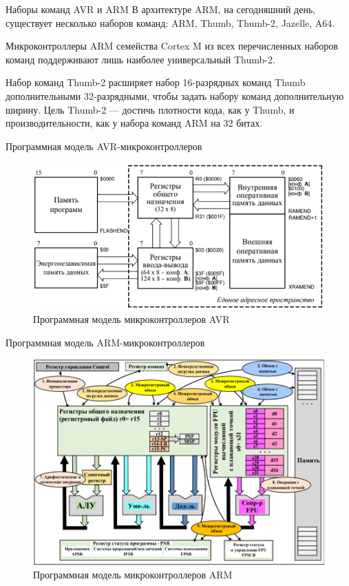 \documentclass[12pt,a4paper,mathserif]{beamer}
\begin{document}
\begin{frame}{Наборы команд AVR и ARM}
    \setlength{\parindent}{0.5cm}
    В архитектуре ARM, на сегодняшний день, существует несколько наборов команд: ARM, Thumb, Thumb-2, Jazelle, A64.
    
    Микроконтроллеры ARM семейства Cortex M из всех перечисленных наборов команд поддерживают лишь наиболее универсальный Thumb-2.
    
    Набор команд Thumb-2 расширяет набор 16-разрядных команд Thumb дополнительными 32-разрядными, чтобы задать набору команд дополнительную ширину. Цель Thumb-2 --- достичь плотности кода, как у Thumb, и производительности, как у набора команд ARM на 32 битах.
\end{frame}

\begin{frame}{Программная модель AVR-микроконтроллеров}
    \begin{figure}
        \centering
        \includegraphics[scale=0.8]{Program_model_AVR.png}
        \caption{Программная модель микроконтроллеров AVR}
        \label{fig:prog_AVR}
    \end{figure}
\end{frame}

\begin{frame}{Программная модель ARM-микроконтроллеров}
    \begin{figure}
        \centering
        \includegraphics[scale=0.45]{Program_model_ARM.png}
        \caption{Программная модель микроконтроллеров ARM}
        \label{fig:prog_ARM}
    \end{figure}
\end{frame}
\end{document}
